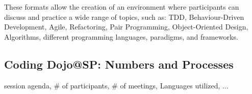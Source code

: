 These formats allow the creation of an environment where participants can discuss and
practice a wide range of topics, such as: TDD, Behaviour-Driven Development, Agile, Refactoring, Pair Programming,
Object-Oriented Design, Algorithms, different programming languages, paradigms, and frameworks.

\subsection{Coding Dojo@SP: Numbers and Processes}\label{subsec:dojosp}

session agenda, \# of participants, \# of meetings, Languages utilized, ...\cite{DojoWiki}


